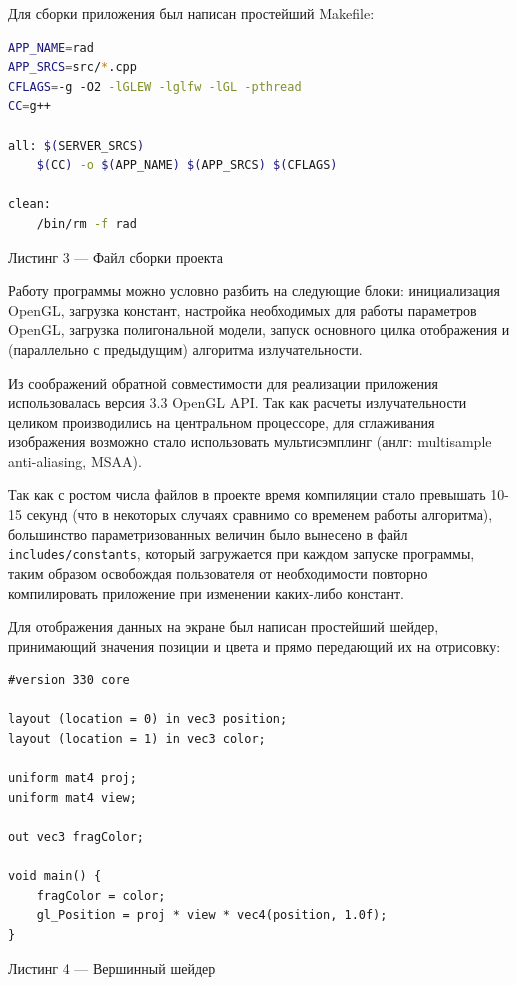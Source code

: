 \documentclass[12pt]{article}
\begin{document}
Для сборки приложения был написан простейший Makefile:
\begin{lstlisting}[language=Bash]
APP_NAME=rad
APP_SRCS=src/*.cpp
CFLAGS=-g -O2 -lGLEW -lglfw -lGL -pthread
CC=g++

all: $(SERVER_SRCS)
	$(CC) -o $(APP_NAME) $(APP_SRCS) $(CFLAGS)

clean:
	/bin/rm -f rad
\end{lstlisting}
\begin{center}Листинг 3 --- Файл сборки проекта\end{center}

Работу программы можно условно разбить на следующие блоки: инициализация OpenGL, загрузка констант, настройка необходимых для работы параметров OpenGL, загрузка полигональной модели, запуск основного цилка отображения и (параллельно с предыдущим) алгоритма излучательности.

Из соображений обратной совместимости для реализации приложения использовалась версия 3.3 OpenGL API. Так как расчеты излучательности целиком производились на центральном процессоре, для сглаживания изображения возможно стало использовать мультисэмплинг (анлг: multisample anti-aliasing, MSAA). 

Так как с ростом числа файлов в проекте время компиляции стало превышать 10-15 секунд (что в некоторых случаях сравнимо со временем работы алгоритма), большинство параметризованных величин было вынесено в файл \texttt{includes/constants}, который загружается при каждом запуске программы, таким образом освобождая пользователя от необходимости повторно компилировать приложение при изменении каких-либо констант.

Для отображения данных на экране был написан простейший шейдер, принимающий значения позиции и цвета и прямо передающий их на отрисовку:
\begin{lstlisting}
#version 330 core

layout (location = 0) in vec3 position;
layout (location = 1) in vec3 color;

uniform mat4 proj;
uniform mat4 view;

out vec3 fragColor;

void main() {
    fragColor = color;
    gl_Position = proj * view * vec4(position, 1.0f);
}
\end{lstlisting}
\begin{center}Листинг 4 --- Вершинный шейдер\end{center}
\end{document}
